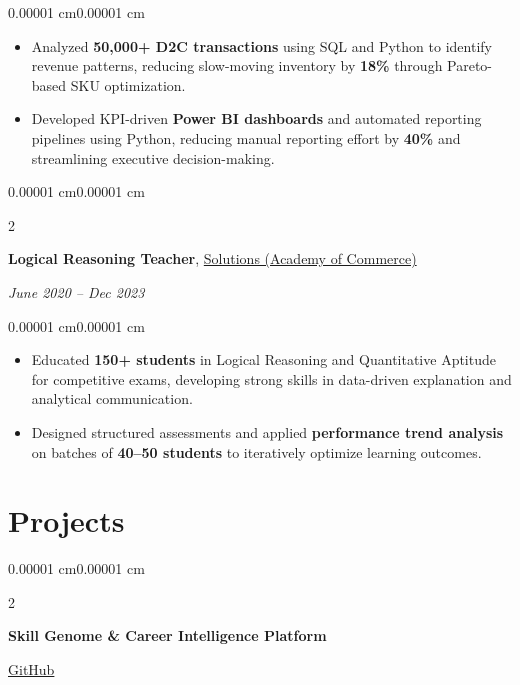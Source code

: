 \documentclass[10pt, letterpaper]{article}
\newenvironment{highlights}{
    \begin{itemize}[
        topsep=0.10 cm,
        parsep=0.10 cm,
        partopsep=0pt,
        itemsep=0pt,
        leftmargin=10pt
    ]
}{
    \end{itemize}
}
\newenvironment{onecolentry}{
    \begin{adjustwidth}{0.00001 cm}{0.00001 cm}
}{
    \end{adjustwidth}
}
\newenvironment{twocolentry}[2][]{
    \onecolentry
    \def\secondColumn{#2}
    \setcolumnwidth{\fill, 4.5 cm}
    \begin{paracol}{2}
}{
    \switchcolumn \raggedleft \secondColumn
    \end{paracol}
    \endonecolentry
}
\begin{document}
\vspace{0.06cm}

\begin{onecolentry}
\begin{highlights}
\item Analyzed \textbf{50,000+ D2C transactions} using SQL and Python to identify revenue patterns, reducing slow-moving inventory by \textbf{18\%} through Pareto-based SKU optimization.
\item Developed KPI-driven \textbf{Power BI dashboards} and automated reporting pipelines using Python, reducing manual reporting effort by \textbf{40\%} and streamlining executive decision-making.
\end{highlights}
\end{onecolentry}

\vspace{0.08cm}

\begin{twocolentry}{\textit{June 2020 -- Dec 2023}}
\textbf{Logical Reasoning Teacher}, \textcolor{myblue}{\underline{Solutions (Academy of Commerce)}} 
\end{twocolentry}

\vspace{0.06cm}

\begin{onecolentry}
\begin{highlights}
\item Educated \textbf{150+ students} in Logical Reasoning and Quantitative Aptitude for competitive exams, developing strong skills in data-driven explanation and analytical communication.
\item Designed structured assessments and applied \textbf{performance trend analysis} on batches of \textbf{40--50 students} to iteratively optimize learning outcomes.
\end{highlights}
\end{onecolentry}

\section{\textcolor{myblue}{\textbf{Projects}}}

\begin{twocolentry}{\href{https://github.com/Verma-Rohil/skill-genome-platform}{\textcolor{myblue}{\faIcon{github} GitHub}}}
\textbf{Skill Genome \& Career Intelligence Platform}
\end{twocolentry}
\end{document}
